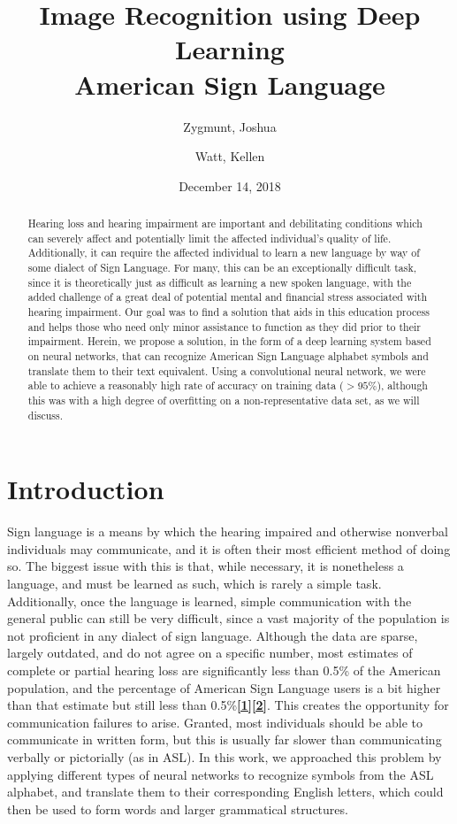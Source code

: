 \documentclass[10pt,Times New Roman]{article}
\title{Image Recognition using Deep Learning \\
       American Sign Language}
\author{Zygmunt, Joshua 
        \and
        Watt, Kellen}
\date{December 14, 2018}
\begin{document}
\maketitle
\begin{abstract}
    Hearing loss and hearing impairment are important and debilitating conditions which can
    severely affect and potentially limit the affected individual’s quality of life.
    Additionally, it can require the affected individual to learn a new language by way of
    some dialect of Sign Language. For many, this can be an exceptionally difficult task,
    since it is theoretically just as difficult as learning a new spoken language, with the
    added challenge of a great deal of potential mental and financial stress associated with
    hearing impairment. Our goal was to find a solution that aids in this education process 
    and helps those who need only minor assistance to function as they did prior to their
    impairment. Herein, we propose a solution, in the form of a deep learning system based
    on neural networks, that can recognize American Sign Language alphabet symbols and
    translate them to their text equivalent. Using a convolutional neural network, we were
    able to achieve a reasonably high rate of accuracy on training data ($>95\%$),
    although this was with a high degree of overfitting on a non-representative data set,
    as we will discuss.
\end{abstract}

\section{Introduction}
    Sign language is a means by which the hearing impaired and otherwise nonverbal individuals
    may communicate, and it is often their most efficient method of doing so. The biggest issue
    with this is that, while necessary, it is nonetheless a language, and must be learned as
    such, which is rarely a simple task. Additionally, once the language is learned, simple
    communication with the general public can still be very difficult, since a vast majority
    of the population is not proficient in any dialect of sign language. Although the data are
    sparse, largely outdated, and do not agree on a specific number, most estimates of complete
    or partial hearing loss are significantly less than 0.5\% of the American population, and
    the percentage of American Sign Language users is a bit higher than that estimate but still
    less than 0.5\%\textbf{\underline{[1][2]}}. This creates the opportunity for communication
    failures to arise. Granted, most individuals should be able to communicate in written form,
    but this is usually far slower than communicating verbally or pictorially (as in ASL).
    In this work, we approached this problem by applying different types of neural networks
    to recognize symbols from the ASL alphabet, and translate them to their corresponding
    English letters, which could then be used to form words and larger grammatical structures.
\end{document}
